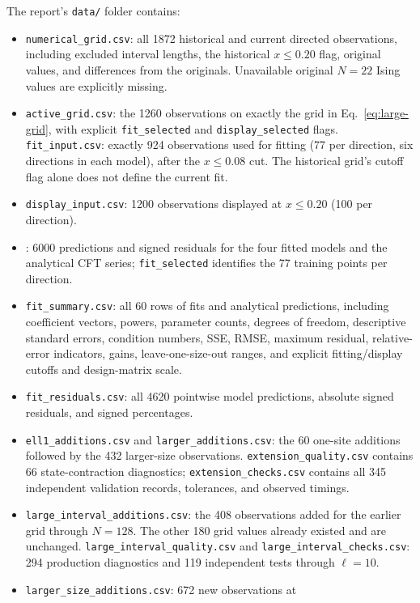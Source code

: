 The report's \texttt{data/} folder contains:
\begin{itemize}
\item \texttt{numerical\_grid.csv}: all 1872 historical and current directed observations,
including excluded interval lengths, the historical $x\leq0.20$ flag, original values,
and differences from the originals. Unavailable original $N=22$ Ising
values are explicitly missing.
\item \texttt{active\_grid.csv}: the 1260 observations on exactly the grid
in Eq.~\eqref{eq:large-grid}, with explicit \texttt{fit\_selected} and
\texttt{display\_selected} flags.
\texttt{fit\_input.csv}: exactly 924 observations used for fitting
(77 per direction, six directions in each model), after the $x\leq0.08$ cut.
The historical grid's cutoff flag alone does not define the current fit.
\item \texttt{display\_input.csv}: 1200 observations displayed at
$x\leq0.20$ (100 per direction).
\item {}:
6000 predictions and signed residuals for the four fitted models and the analytical CFT series;
\texttt{fit\_selected} identifies the 77 training points per direction.
\item \texttt{fit\_summary.csv}: all 60 rows of fits and analytical predictions, including
coefficient vectors, powers, parameter counts, degrees of freedom,
descriptive standard errors, condition numbers, SSE, RMSE, maximum
residual, relative-error indicators, gains, leave-one-size-out ranges,
and explicit fitting/display cutoffs and design-matrix scale.
\item \texttt{fit\_residuals.csv}: all 4620 pointwise model predictions,
absolute signed residuals, and signed percentages.
\item \texttt{ell1\_additions.csv} and \texttt{larger\_additions.csv}:
the 60 one-site additions followed by the 432 larger-size observations.
\texttt{extension\_quality.csv} contains 66 state-contraction diagnostics;
\texttt{extension\_checks.csv} contains all 345 independent validation
records, tolerances, and observed timings.
\item \texttt{large\_interval\_additions.csv}: the 408 observations
added for the earlier grid through $N=128$. The other 180 grid values already
existed and are unchanged. \texttt{large\_interval\_quality.csv} and
\texttt{large\_interval\_checks.csv}: 294 production diagnostics and
119 independent tests through $\ell=10$.
\item \texttt{larger\_size\_additions.csv}: 672 new observations at

\end{itemize}
